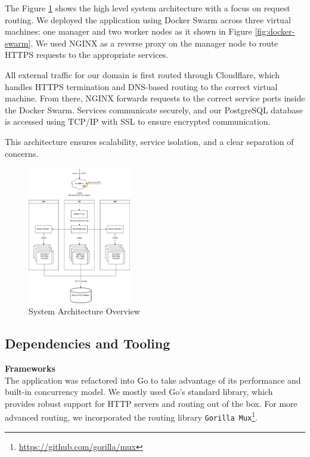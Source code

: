 The Figure \ref{fig:arch-overview} shows the high level system architecture with a focus on request routing. We deployed the application using Docker Swarm across three virtual machines: one manager and two worker nodes as it shown in Figure \ref{fig:docker-swarm}. We used NGINX as a reverse proxy on the manager node to route HTTPS requests to the appropriate services.

All external traffic for our domain is first routed through Cloudflare, which handles HTTPS termination and DNS-based routing to the correct virtual machine. From there, NGINX forwards requests to the correct service ports inside the Docker Swarm. Services communicate securely, and our PostgreSQL database is accessed using TCP/IP with SSL to ensure encrypted communication.

This architecture ensures scalability, service isolation, and a clear separation of concerns.
\begin{figure}[H]
  \centering
  \includegraphics[width=0.4\textwidth]{report/images/arch-overview.png}
  \caption{System Architecture Overview}
  \label{fig:arch-overview}
\end{figure}


\subsection{Dependencies and Tooling}
\textbf{Frameworks}
\\
The application was refactored into Go to take advantage of its performance and built-in concurrency model. We mostly used Go’s standard library, which provides robust support for HTTP servers and routing out of the box. For more advanced routing, we incorporated the routing library \texttt{Gorilla Mux}\footnote{\url{https://github.com/gorilla/mux}}.
\\

